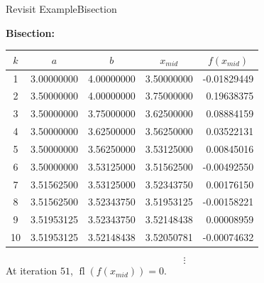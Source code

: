 \documentclass[10pt]{beamer}
\begin{document}
\begin{frame}{Revisit Example}{Bisection}

\textbf{Bisection:}
\begin{center}
  \small
  \renewcommand{\arraystretch}{1.3}
    \begin{tabular}{clllr}
     $k$ & \multicolumn{1}{c}{$a$}
         & \multicolumn{1}{c}{$b$}
         & \multicolumn{1}{c}{$x_{mid}$}
         & \multicolumn{1}{c}{$f(x_{mid})$} \\ \hline
      1 & 3.00000000 & 4.00000000 & 3.50000000 & -0.01829449 \\
      2 & 3.50000000 & 4.00000000 & 3.75000000 &  0.19638375 \\
      3 & 3.50000000 & 3.75000000 & 3.62500000 &  0.08884159 \\
      4 & 3.50000000 & 3.62500000 & 3.56250000 &  0.03522131 \\
      5 & 3.50000000 & 3.56250000 & 3.53125000 &  0.00845016 \\
      6 & 3.50000000 & 3.53125000 & 3.51562500 & -0.00492550 \\
      7 & 3.51562500 & 3.53125000 & 3.52343750 &  0.00176150 \\
      8 & 3.51562500 & 3.52343750 & 3.51953125 & -0.00158221 \\
      9 & 3.51953125 & 3.52343750 & 3.52148438 &  0.00008959 \\
     10 & 3.51953125 & 3.52148438 & 3.52050781 & -0.00074632
    \end{tabular}
\end{center}

\vfill

\begin{center}
\[
\vdots
\]
At iteration $51$, $\operatorname{fl}(f(x_{mid}))=0$.
\end{center}

\end{frame}
\end{document}
